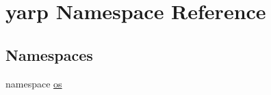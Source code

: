 \hypertarget{namespaceyarp}{
\section{yarp Namespace Reference}
\label{namespaceyarp}
}
\subsection*{Namespaces}
\begin{DoxyCompactItemize}
\item 
namespace \hyperlink{namespaceyarp_1_1os}{os}
\end{DoxyCompactItemize}
